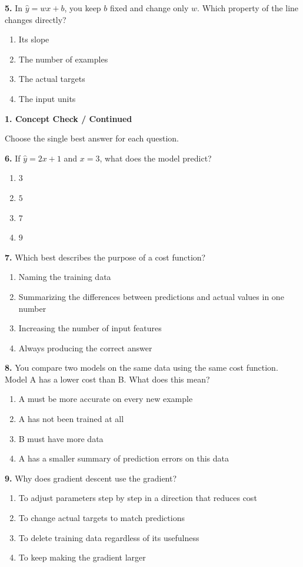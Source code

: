 \documentclass[11pt,a4paper]{article}
\newcommand{\parttitle}[2]{{\large\bfseries\color{ink} #1}\par{\small #2}\par\vspace{5mm}}
\newcommand{\question}[2]{\textbf{#1.} #2\par}
\begin{document}
\question{5}{In $\hat y=wx+b$, you keep $b$ fixed and change only $w$. Which property of the line changes directly?}
\begin{enumerate}[label=(\arabic*),leftmargin=9mm,itemsep=0pt,topsep=2pt,parsep=0pt]
\item Its slope
\item The number of examples
\item The actual targets
\item The input units
\end{enumerate}\vfill
\newpage
\parttitle{1. Concept Check / Continued}{Choose the single best answer for each question.}
\question{6}{If $\hat y=2x+1$ and $x=3$, what does the model predict?}
\begin{enumerate}[label=(\arabic*),leftmargin=9mm,itemsep=0pt,topsep=2pt,parsep=0pt]
\item $3$
\item $5$
\item $7$
\item $9$
\end{enumerate}\vfill
\question{7}{Which best describes the purpose of a cost function?}
\begin{enumerate}[label=(\arabic*),leftmargin=9mm,itemsep=0pt,topsep=2pt,parsep=0pt]
\item Naming the training data
\item Summarizing the differences between predictions and actual values in one number
\item Increasing the number of input features
\item Always producing the correct answer
\end{enumerate}\vfill
\question{8}{You compare two models on the same data using the same cost function. Model A has a lower cost than B. What does this mean?}
\begin{enumerate}[label=(\arabic*),leftmargin=9mm,itemsep=0pt,topsep=2pt,parsep=0pt]
\item A must be more accurate on every new example
\item A has not been trained at all
\item B must have more data
\item A has a smaller summary of prediction errors on this data
\end{enumerate}\vfill
\question{9}{Why does gradient descent use the gradient?}
\begin{enumerate}[label=(\arabic*),leftmargin=9mm,itemsep=0pt,topsep=2pt,parsep=0pt]
\item To adjust parameters step by step in a direction that reduces cost
\item To change actual targets to match predictions
\item To delete training data regardless of its usefulness
\item To keep making the gradient larger
\end{enumerate}\vfill
\end{document}
